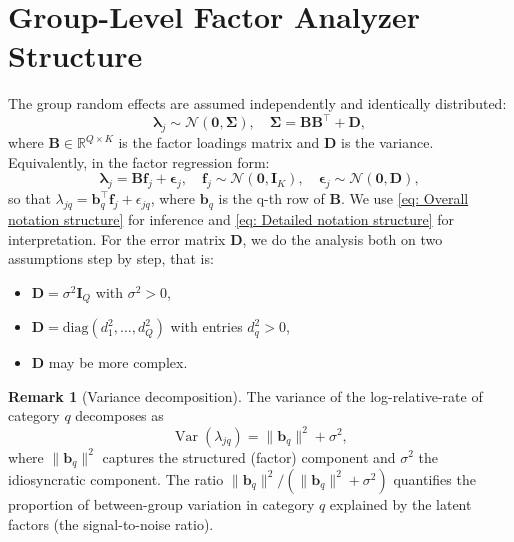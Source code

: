 \documentclass[]{report}
\theoremstyle{definition}
\newtheorem{remark}{Remark}
\begin{document}
\section{Group-Level Factor Analyzer Structure}
    The group random effects are assumed independently and identically distributed:
\begin{equation}
    \bm{\lambda}_{j}\sim \mathcal{N}(\bm{0},\bm{\Sigma}), \quad \bm{\Sigma}=\mathbf{BB}^{\top}+\mathbf{D},
    \label{eq: Overall notation structure}
\end{equation}
where $\mathbf{B}\in \mathbb{R}^{Q\times K}$ is the factor loadings matrix and $\mathbf{D}$ is the variance. Equivalently, in the factor regression form:
\begin{equation}
    \bm{\lambda}_{j}=\mathbf{B}\mathbf{f}_{j}+\bm{\epsilon}_{j}, \quad \mathbf{f}_{j}\sim \mathcal{N}(\bm{0},\bm{I}_{K}), \quad \bm{\epsilon}_{j}\sim \mathcal{N}(\bm{0},\mathbf{D}),
    \label{eq: Detailed notation structure}
\end{equation}
so that $\lambda_{jq}=\mathbf{b}_{q}^{\top}\mathbf{f}_{j}+\epsilon_{jq}$, where $\mathbf{b}_{q}$ is the q-th row of $\mathbf{B}$. We use \ref{eq: Overall notation structure} for inference and \ref{eq: Detailed notation structure} for interpretation.
    For the error matrix $\mathbf{D}$, we do the analysis both on two assumptions step by step, that is:
\begin{itemize}
    \item $\mathbf{D}=\sigma^{2}\mathbf{I}_{Q}$ with $\sigma^{2} >0$,
    \item $\mathbf{D}=\text{diag}(d_{1}^{2},\dots,d_{Q}^{2})$ with entries $d_{q}^{2}>0$,
    \item $\mathbf{D}$ may be more complex.
\end{itemize}
\begin{remark}[Variance decomposition]
    The variance of the log-relative-rate of category $q$ decomposes as 
    \begin{equation*}
        \operatorname{Var}(\lambda_{jq})=\|\mathbf{b}_{q}\|^{2}+\sigma^{2},
    \end{equation*}
where $\|\mathbf{b}_{q}\|^{2}$ captures the structured (factor) component and $\sigma^2$ the idiosyncratic component. The ratio $\|\mathbf{b}_{q}\|^2/(\|\mathbf{b}_{q}\|^2+\sigma^2)$ quantifies the proportion of between-group variation in category $q$ explained by the latent factors (the signal-to-noise ratio). 
\end{remark}
\end{document}
